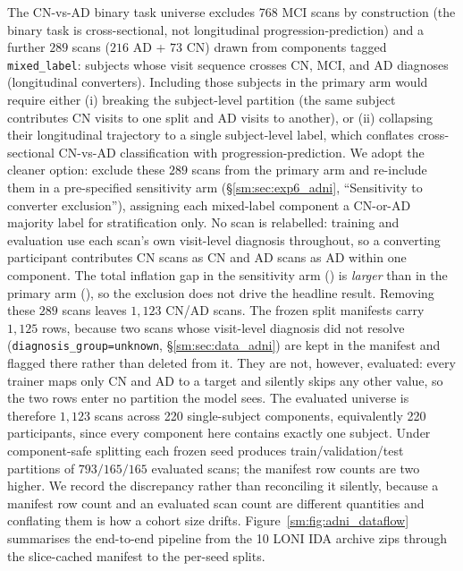 \documentclass[11pt]{article}
\begin{document}
The CN-vs-AD binary task universe excludes 768 MCI scans by
construction (the binary task is cross-sectional, not longitudinal
progression-prediction) and a further $289$ scans
($216$ AD + $73$ CN) drawn from components tagged
\texttt{mixed\_\allowbreak{}label}: subjects whose visit
sequence crosses CN, MCI, and AD diagnoses (longitudinal converters).
Including those subjects in the primary arm would require either
(i) breaking the subject-level partition (the same subject
contributes CN visits to one split and AD visits to another), or
(ii) collapsing their longitudinal trajectory to a single subject-level
label, which conflates cross-sectional CN-vs-AD classification with
progression-prediction. We adopt the cleaner option: exclude these
$289$ scans from the primary arm and re-include them in a
pre-specified sensitivity arm (\S\ref{sm:sec:exp6_adni},
``Sensitivity to converter exclusion''), assigning each mixed-label
component a CN-or-AD majority label for stratification only. No scan is
relabelled: training and evaluation use each scan's own visit-level
diagnosis throughout, so a converting participant contributes CN scans
as CN and AD scans as AD within one component. The total inflation
gap in the sensitivity arm (\AdniConvGap{}) is \emph{larger} than in
the primary arm (\AdniGapTotal{}), so the exclusion does not drive the
headline result.
Removing these $289$ scans leaves $1{,}123$ CN/AD scans. The frozen
split manifests carry $1{,}125$ rows, because two scans whose
visit-level diagnosis did not resolve
(\texttt{diagnosis\_group=unknown}, \S\ref{sm:sec:data_adni}) are kept in
the manifest and flagged there rather than deleted from it. They are
not, however, evaluated: every trainer maps only CN and AD to a target
and silently skips any other value, so the two rows enter no partition
the model sees. The evaluated universe is therefore $1{,}123$ scans
across 220 single-subject components, equivalently 220 participants,
since every component here contains exactly one subject. Under
component-safe splitting each frozen seed produces train/validation/test
partitions of $793/165/165$ evaluated scans; the manifest row counts are
two higher. We record the discrepancy rather than reconciling it
silently, because a manifest row count and an evaluated scan count are
different quantities and conflating them is how a cohort size drifts. Figure~\ref{sm:fig:adni_dataflow} summarises the
end-to-end pipeline from the 10 LONI IDA archive zips through the
slice-cached manifest to the per-seed splits.

\end{document}
